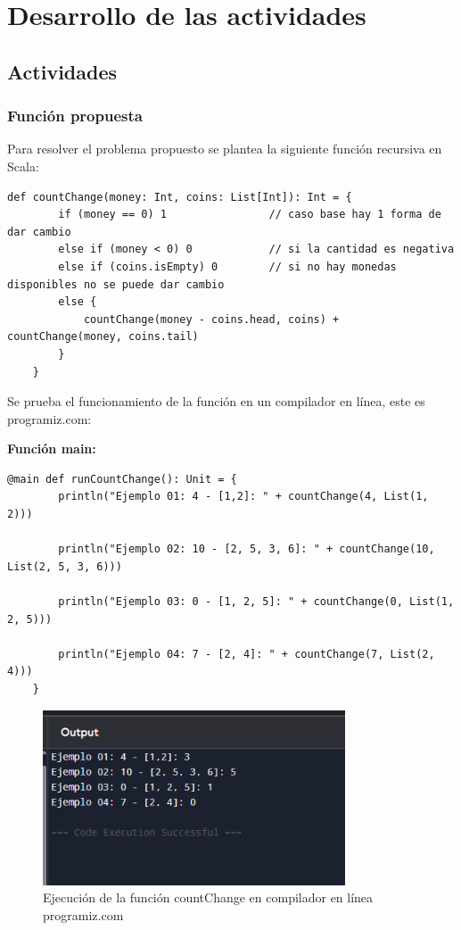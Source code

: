 \section{Desarrollo de las actividades}

\subsection {Actividades}

\subsubsection {Función propuesta}

Para resolver el problema propuesto se plantea la siguiente función recursiva en Scala:

\begin{lstlisting}[style=scala-custom, caption={Función countChange en Scala}]
    def countChange(money: Int, coins: List[Int]): Int = {
        if (money == 0) 1                // caso base hay 1 forma de dar cambio
        else if (money < 0) 0            // si la cantidad es negativa
        else if (coins.isEmpty) 0        // si no hay monedas disponibles no se puede dar cambio
        else {
            countChange(money - coins.head, coins) + countChange(money, coins.tail)
        }
    }
\end{lstlisting}

Se prueba el funcionamiento de la función en un compilador en línea, este es programiz.com:

\textbf{Función main:}

\begin{lstlisting}[style=scala-custom, caption={Función main para probar el funcionamiento de countChange}]
    @main def runCountChange(): Unit = {
        println("Ejemplo 01: 4 - [1,2]: " + countChange(4, List(1, 2)))    

        println("Ejemplo 02: 10 - [2, 5, 3, 6]: " + countChange(10, List(2, 5, 3, 6)))

        println("Ejemplo 03: 0 - [1, 2, 5]: " + countChange(0, List(1, 2, 5)))

        println("Ejemplo 04: 7 - [2, 4]: " + countChange(7, List(2, 4)))
    }
\end{lstlisting}

\begin{figure}[H]
    \centering
    \includegraphics[width=0.8\textwidth]{img/prueba_ejecucion.png}
    \caption{Ejecución de la función countChange en compilador en línea programiz.com}
    \label{fig:compilador_en_linea}
\end{figure}

